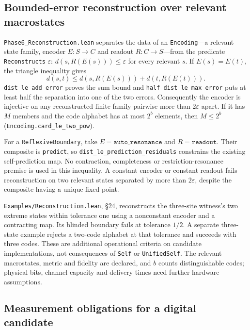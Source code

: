 \documentclass{article}
\begin{document}
\subsection{Bounded-error reconstruction over relevant macrostates}
\label{sec:supp-reconstruction-family}

\nolinkurl{Phase6_Reconstruction.lean} separates the data of an
\texttt{Encoding}---a relevant state family, encoder $E:S\to C$ and readout
$R:C\to S$---from the predicate \texttt{Reconstructs} $\varepsilon$:
$d(s,R(E(s)))\leq\varepsilon$ for every relevant $s$.
If $E(s)=E(t)$, the triangle inequality gives
\begin{equation}
 d(s,t)\leq d(s,R(E(s)))+d(t,R(E(t))).
 \label{eq:supp-reconstruction-split}
\end{equation}
\nolinkurl{dist_le_add_error} proves the
sum bound and \nolinkurl{half_dist_le_max_error}
puts at least half the separation into one of the two errors.
Consequently the encoder is injective on any reconstructed finite family
pairwise more than $2\varepsilon$ apart. If it has $M$ members and the code
alphabet has at most $2^b$ elements, then $M\leq2^b$
(\nolinkurl{Encoding.card_le_two_pow}).

For a \texttt{ReflexiveBoundary}, take $E=\texttt{auto\_resonance}$ and
$R=\texttt{readout}$. Their composite is \texttt{predict}, so
\nolinkurl{dist_le_prediction_residuals}
constrains the existing self-prediction map. No contraction, completeness or
restriction-resonance premise is used in this inequality.
A constant encoder or constant readout fails reconstruction on two relevant
states separated by more than $2\varepsilon$, despite the composite having a
unique fixed point.

\nolinkurl{Examples/Reconstruction.lean}, \S24, reconstructs the
three-site witness's two extreme states within tolerance one using a nonconstant encoder
and a contracting map. Its blinded boundary fails at tolerance $1/2$.
A separate three-state example rejects a two-code alphabet at that tolerance
and succeeds with three codes. These are additional operational criteria on
candidate implementations, not consequences of \texttt{Self} or
\texttt{UnifiedSelf}. The relevant macrostates, metric and fidelity are
declared, and $b$ counts distinguishable codes; physical bits, channel
capacity and delivery times need further hardware assumptions.

\subsection{Measurement obligations for a digital candidate}
\label{sec:supp-gpu}
\end{document}
